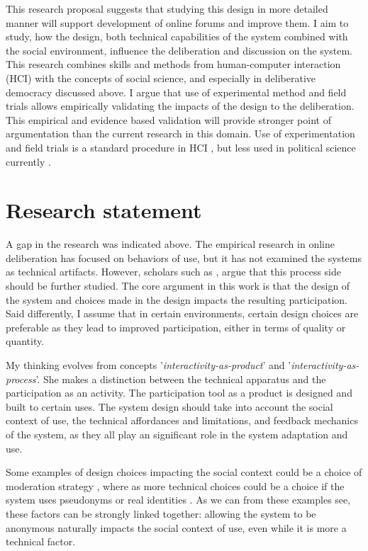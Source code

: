 \documentclass{article}
\begin{document}
This research proposal suggests that studying this design in more detailed manner will support development of online forums and improve them. I aim to study, how the design, both technical capabilities of the system combined with the social environment, influence the deliberation and discussion on the system. This research combines skills and methods from human-computer interaction (HCI) with the concepts of social science, and especially in deliberative democracy discussed above. I argue that use of experimental method and field trials allows empirically validating the impacts of the design to the deliberation. This empirical and evidence based validation will provide stronger point of argumentation than the current research in this domain. Use of experimentation and field trials is a standard procedure in HCI , but less used in political science currently .

\section{Research statement}

A gap in the research was indicated above. The empirical research in online deliberation has focused on behaviors of use, but it has not examined the systems as technical artifacts. However, scholars such as , argue that this process side should be further studied. The core argument in this work is that the design of the system and choices made in the design impacts the resulting participation. Said differently, I assume that in certain environments, certain design choices are preferable as they lead to improved participation, either in terms of quality or quantity.

My thinking evolves from  concepts '\textit{interactivity-as-product}' and '\textit{interactivity-as-process}'. She makes a distinction between the technical apparatus and the participation as an activity. The participation tool as a product is designed and built to certain uses. The system design should take into account the social context of use, the technical affordances and limitations, and feedback mechanics of the system, as they all play an significant role in the system adaptation and use.

Some examples of design choices impacting the social context could be a choice of moderation strategy \cite{wright07}, where as more technical choices could be a choice if the system uses pseudonyms or real identities \cite{kilner05}. As we can from these examples see, these factors can be strongly linked together: allowing the system to be anonymous naturally impacts the social context of use, even while it is more a technical factor.
\end{document}
